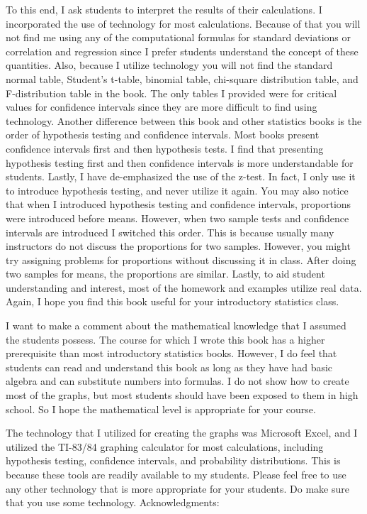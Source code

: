\documentclass[]{book}
\begin{document}
To this end, I ask students to interpret the results of their calculations. I incorporated the use of technology for most calculations. Because of that you will not find me using any of the computational formulas for standard deviations or correlation and regression since I prefer students understand the concept of these quantities. Also, because I utilize technology you will not find the standard normal table, Student's t-table, binomial table, chi-square distribution table, and F-distribution table in the book. The only tables I provided were for critical values for confidence intervals since they are more difficult to find using technology. Another difference between this book and other statistics books is the order of hypothesis testing and confidence intervals. Most books present confidence intervals first and then hypothesis tests. I find that presenting hypothesis testing first and then confidence intervals is more understandable for students. Lastly, I have de-emphasized the use of the z-test. In fact, I only use it to introduce hypothesis testing, and never utilize it again. You may also notice that when I introduced hypothesis testing and confidence intervals, proportions were introduced before means. However, when two sample tests and confidence intervals are introduced I switched this order. This is because usually many instructors do not discuss the proportions for two samples. However, you might try assigning problems for proportions without discussing it in class. After doing two samples for means, the proportions are similar. Lastly, to aid student understanding and interest, most of the homework and examples utilize real data. Again, I hope you find this book useful for your introductory statistics class.

I want to make a comment about the mathematical knowledge that I assumed the students possess. The course for which I wrote this book has a higher prerequisite than most introductory statistics books. However, I do feel that students can read and understand this book as long as they have had basic algebra and can substitute numbers into formulas. I do not show how to create most of the graphs, but most students should have been exposed to them in high school. So I hope the mathematical level is appropriate for your course.

The technology that I utilized for creating the graphs was Microsoft Excel, and I utilized the TI-83/84 graphing calculator for most calculations, including hypothesis testing, confidence intervals, and probability distributions. This is because these tools are readily available to my students. Please feel free to use any other technology that is more appropriate for your students. Do make sure that you use some technology.
Acknowledgments:
\end{document}
